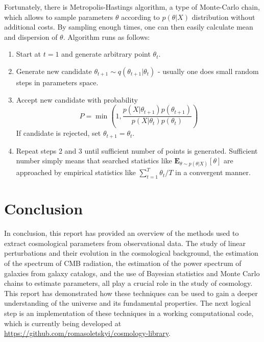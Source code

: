 \documentclass[12pt]{extarticle}
\numberwithin{problem}{section}
\numberwithin{theorem}{section}
\begin{document}
	Fortunately, there is Metropolis-Hastings algorithm, a type of Monte-Carlo chain, which allows to sample parameters $\theta$ according to $p(\theta|X)$ distribution without additional costs. By sampling enough times, one can then easily calculate mean and dispersion of $\theta$. Algorithm runs as follows:
	\begin{enumerate}
		\item Start at $t=1$ and generate arbitrary point $\theta_t$.
		\item Generate new candidate $\theta_{t+1}\sim q(\theta_{t+1}|\theta_t)$ - usually one does small random steps in parameters space.
		\item Accept new candidate with probability
		\begin{equation}
			P = \min\left(1, \frac{p(X|\theta_{t+1})p(\theta_{t+1})}{p(X|\theta_t)p(\theta_t)}\right)
		\end{equation} 
		If candidate is rejected, set $\theta_{t+1} = \theta_t$.
		\item Repeat steps 2 and 3 until sufficient number of points is generated. Sufficient number simply means that searched statistics like $\mathbf{E}_{\theta\sim p(\theta|X)}[\theta]$ are approached by empirical statistics like $\sum_{t=1}^T \theta_t / T$ in a convergent manner.
	\end{enumerate}

	\section{Conclusion}
	In conclusion, this report has provided an overview of the methods used to extract cosmological parameters from observational data. The study of linear perturbations and their evolution in the cosmological background, the estimation of the spectrum of CMB radiation, the estimation of the power spectrum of galaxies from galaxy catalogs, and the use of Bayesian statistics and Monte Carlo chains to estimate parameters, all play a crucial role in the study of cosmology. This report has demonstrated how these techniques can be used to gain a deeper understanding of the universe and its fundamental properties. The next logical step is an implementation of these techniques in a working computational code, which is currently being developed at \url{https://github.com/romasoletskyi/cosmology-library}.
	
	
	
\end{document}
